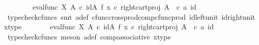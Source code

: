 \begin{isabellebody}
\ \ \ \ \ \ \ \ {\isacharparenleft}{\kern0pt}eval{\isacharunderscore}{\kern0pt}func\ X\ A{\isacharparenright}{\kern0pt}\ {\isasymcirc}\isactrlsub c\ {\isacharparenleft}{\kern0pt}{\isacharparenleft}{\kern0pt}id{\isacharparenleft}{\kern0pt}A{\isacharparenright}{\kern0pt}\ {\isasymtimes}\isactrlsub f\ {\isacharparenleft}{\kern0pt}x\ {\isasymcirc}\isactrlsub c\ right{\isacharunderscore}{\kern0pt}cart{\isacharunderscore}{\kern0pt}proj\ A\ {\isasymone}{\isacharparenright}{\kern0pt}\isactrlsup {\isasymsharp}{\isacharparenright}{\kern0pt}\ {\isasymcirc}\isactrlsub c\ {\isasymlangle}a{\isacharcomma}{\kern0pt}\ id{\isacharparenleft}{\kern0pt}{\isasymone}{\isacharparenright}{\kern0pt}{\isasymrangle}{\isacharparenright}{\kern0pt}{\isachardoublequoteclose}\isanewline
\ \ \ \ \isamarkupfalse%
\ {\isacharparenleft}{\kern0pt}typecheck{\isacharunderscore}{\kern0pt}cfuncs{\isacharcomma}{\kern0pt}\ smt\ a{\isacharunderscore}{\kern0pt}def\ cfunc{\isacharunderscore}{\kern0pt}cross{\isacharunderscore}{\kern0pt}prod{\isacharunderscore}{\kern0pt}comp{\isacharunderscore}{\kern0pt}cfunc{\isacharunderscore}{\kern0pt}prod\ id{\isacharunderscore}{\kern0pt}left{\isacharunderscore}{\kern0pt}unit{}\ id{\isacharunderscore}{\kern0pt}right{\isacharunderscore}{\kern0pt}unit{}\ x{\isacharunderscore}{\kern0pt}type{}{\isacharparenright}{\kern0pt}\isanewline
\ \ \isamarkupfalse%
\ \isamarkupfalse%
\ {\isachardoublequoteopen}{\isachardot}{\kern0pt}{\isachardot}{\kern0pt}{\isachardot}{\kern0pt}\ {\isacharequal}{\kern0pt}\ {\isacharparenleft}{\kern0pt}{\isacharparenleft}{\kern0pt}eval{\isacharunderscore}{\kern0pt}func\ X\ A{\isacharparenright}{\kern0pt}\ {\isasymcirc}\isactrlsub c\ {\isacharparenleft}{\kern0pt}id{\isacharparenleft}{\kern0pt}A{\isacharparenright}{\kern0pt}\ {\isasymtimes}\isactrlsub f\ {\isacharparenleft}{\kern0pt}x\ {\isasymcirc}\isactrlsub c\ right{\isacharunderscore}{\kern0pt}cart{\isacharunderscore}{\kern0pt}proj\ A\ {\isasymone}{\isacharparenright}{\kern0pt}\isactrlsup {\isasymsharp}{\isacharparenright}{\kern0pt}{\isacharparenright}{\kern0pt}\ {\isasymcirc}\isactrlsub c\ {\isasymlangle}a{\isacharcomma}{\kern0pt}\ id{\isacharparenleft}{\kern0pt}{\isasymone}{\isacharparenright}{\kern0pt}{\isasymrangle}{\isachardoublequoteclose}\isanewline
\ \ \ \ \isamarkupfalse%
\ {\isacharparenleft}{\kern0pt}typecheck{\isacharunderscore}{\kern0pt}cfuncs{\isacharcomma}{\kern0pt}\ meson\ a{\isacharunderscore}{\kern0pt}def\ comp{\isacharunderscore}{\kern0pt}associative{}\ x{\isacharunderscore}{\kern0pt}type{}{\isacharparenright}{\kern0pt}\isanewline

\end{isabellebody}
